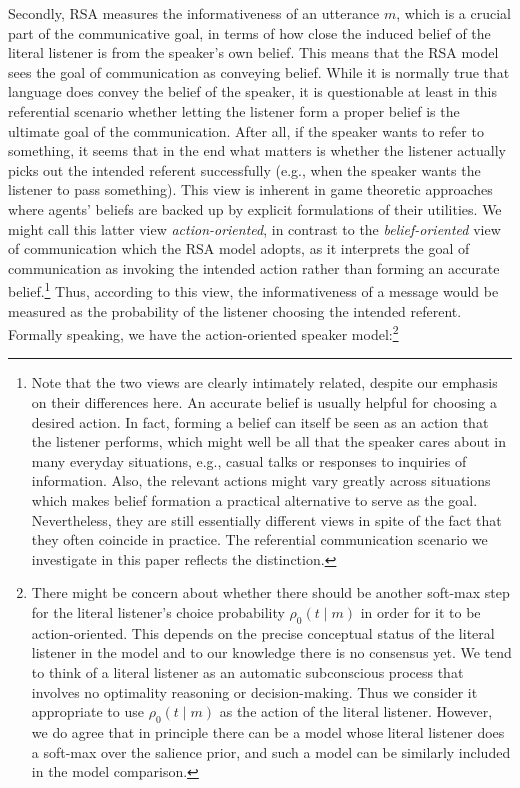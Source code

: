 Secondly, RSA measures the informativeness of an utterance $m$, which
is a crucial part of the communicative goal, in terms of how close the
induced belief of the literal listener is from the speaker's own
belief. This means that the RSA model sees the goal of communication
as conveying belief. While it is normally true that language does
convey the belief of the speaker, it is questionable at least in this
referential scenario whether letting the listener form a proper belief
is the ultimate goal of the communication. After all, if the speaker
wants to refer to something, it seems that in the end what matters is
whether the listener actually picks out the intended referent
successfully (e.g., when the speaker wants the listener to pass
something). This view is inherent in game theoretic approaches where
agents' beliefs are backed up by explicit formulations of their
utilities. We might call this latter view \emph{action-oriented}, in
contrast to the \emph{belief-oriented} view of communication which the
RSA model adopts, as it interprets the goal of communication as
invoking the intended action rather than forming an accurate
belief.\footnote{Note that the two views are clearly intimately
  related, despite our emphasis on their differences here. An accurate
  belief is usually helpful for choosing a desired action. In fact,
  forming a belief can itself be seen as an action that the listener
  performs, which might well be all that the speaker cares about in
  many everyday situations, e.g., casual talks or responses to
  inquiries of information. Also, the relevant actions might vary
  greatly across situations which makes belief formation a practical
  alternative to serve as the goal. Nevertheless, they are still
  essentially different views in spite of the fact that they often
  coincide in practice. The referential communication scenario we
  investigate in this paper reflects the distinction.} Thus, according
to this view, the informativeness of a message would be measured as
the probability of the listener choosing the intended
referent. Formally speaking, we have the action-oriented speaker
model:\footnote{There might be concern about whether there should be
  another soft-max step for the literal listener's choice probability
  $\rho_0(t\mid m)$ in order for it to be action-oriented.  This
  depends on the precise conceptual status of the literal listener in
  the model and to our knowledge there is no consensus yet. We tend to
  think of a literal listener as an automatic subconscious process
  that involves no optimality reasoning or decision-making. Thus we
  consider it appropriate to use $\rho_0(t\mid m)$ as the action of
  the literal listener. However, we do agree that in principle there
  can be a model whose literal listener does a soft-max over the
  salience prior, and such a model can be similarly included in the
  model comparison.}
  
